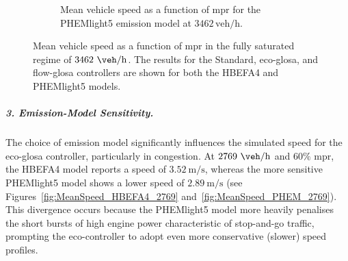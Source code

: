 \begin{figure}[htb]
\begin{subfigure}[b]{0.49\textwidth}
    \caption{Mean vehicle speed as a function of \ac{mpr} for the PHEMlight5 emission model at $3462\,\mathrm{veh/h}$.}
    \label{fig:MeanSpeed_PHEM_3462}
  \end{subfigure}
  \caption[Mean vehicle speed vs. \ac{mpr} at $3462~\unit{\veh\per\hour}$]{Mean vehicle speed as a function of \ac{mpr} in the fully saturated regime of $3462~\unit{\veh\per\hour}$. The results for the Standard, \ac{eco-glosa}, and \ac{flow-glosa} controllers are shown for both the HBEFA4 and PHEMlight5 models.}
\label{fig:MeanSpeed_3462}
\end{figure}

\subparagraph*{3. Emission-Model Sensitivity.}
The choice of emission model significantly influences the simulated speed for the \ac{eco-glosa} controller, particularly in congestion. At $2769~\unit{\veh\per\hour}$ and $60\%$ \ac{mpr}, the HBEFA4 model reports a speed of $3.52~\unit{\metre\per\second}$, whereas the more sensitive PHEMlight5 model shows a lower speed of $2.89~\unit{\metre\per\second}$ (see Figures~\vref{fig:MeanSpeed_HBEFA4_2769} and~\vref{fig:MeanSpeed_PHEM_2769}). This divergence occurs because the PHEMlight5 model more heavily penalises the short bursts of high engine power characteristic of stop-and-go traffic, prompting the eco-controller to adopt even more conservative (slower) speed profiles.

